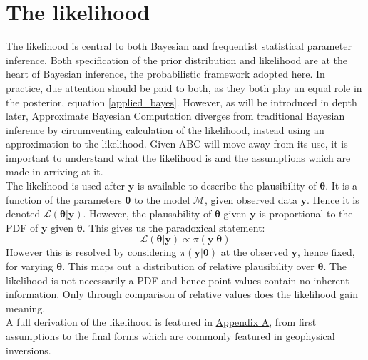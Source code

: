 \section{The likelihood}

The likelihood is central to both Bayesian and frequentist statistical parameter inference. Both specification of the prior distribution and likelihood are at the heart of Bayesian inference, the probabilistic framework adopted here. In practice, due attention should be paid to both, as they both play an equal role in the posterior, equation \ref{applied_bayes}. However, as will be introduced in depth later, Approximate Bayesian Computation diverges from traditional Bayesian inference by circumventing calculation of the likelihood, instead using an approximation to the likelihood. Given ABC will move away from its use, it is important to understand what the likelihood is and the assumptions which are made in arriving at it. \\

The likelihood is used after $\bm{y}$ is available to describe the plausibility of $\bm{\theta}$. It is a function of the parameters $\bm{\theta}$ to the model $\mathcal{M}$, given observed data $\bm{y}$. Hence it is denoted $\mathcal{L}(\bm{\theta}|\bm{y})$. However, the plausability of $\bm{\theta}$ given $\bm{y}$ is proportional to the PDF of $\bm{y}$ given $\bm{\theta}$. This gives us the paradoxical statement:
\begin{equation}
\mathcal{L}(\bm{\theta}|\bm{y}) \propto \pi(\bm{y}|\bm{\theta})
\label{likelihood_def}
\end{equation}
However this is resolved by considering $\pi(\bm{y}|\bm{\theta})$ at the observed $\bm{y}$, hence fixed, for varying $\bm{\theta}$. This maps out a distribution of relative plausibility over $\bm{\theta}$. The likelihood is not necessarily a PDF and hence point values contain no inherent information. Only through comparison of relative values does the likelihood gain meaning.\\

A full derivation of the likelihood is featured in \hyperref[AppendixA]{Appendix A}, from first assumptions to the final forms which are commonly featured in geophysical inversions.


